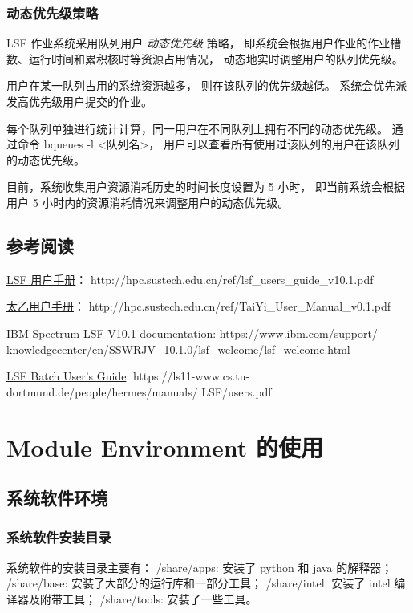 \documentclass[UTF8]{ctexart}
\newcommand{\myem}[1]{{\color{red}\em #1}}
\newcommand{\mynnote}[1]{\colorbox{gray!15}{\color{blue!65}#1}}
\begin{document}
\subsubsection{动态优先级策略}
LSF 作业系统采用队列用户 \myem{动态优先级} 策略，
即系统会根据用户作业的作业槽数、运行时间和累积核时等资源占用情况，
动态地实时调整用户的队列优先级。

用户在某一队列占用的系统资源越多，
则在该队列的优先级越低。
系统会优先派发高优先级用户提交的作业。

每个队列单独进行统计计算，同一用户在不同队列上拥有不同的动态优先级。
通过命令 \mynnote{bqueues -l <队列名>}，
用户可以查看所有使用过该队列的用户在该队列的动态优先级。

目前，系统收集用户资源消耗历史的时间长度设置为 5 小时，
即当前系统会根据用户 5 小时内的资源消耗情况来调整用户的动态优先级。

\subsection{参考阅读}
\href{http://hpc.sustech.edu.cn/ref/lsf_users_guide_v10.1.pdf}{LSF 用户手册}：
http://hpc.sustech.edu.cn/ref/lsf\_users\_guide\_v10.1.pdf

\href{http://hpc.sustech.edu.cn/ref/TaiYi_User_Manual_v0.1.pdf}{太乙用户手册}：
http://hpc.sustech.edu.cn/ref/TaiYi\_User\_Manual\_v0.1.pdf

\href{https://www.ibm.com/support/knowledgecenter/en/SSWRJV_10.1.0/lsf_welcome/lsf_welcome.html}{IBM Spectrum LSF V10.1 documentation}:
https://www.ibm.com/support/\newline
knowledgecenter/en/SSWRJV\_10.1.0/lsf\_welcome/lsf\_welcome.html

\href{https://ls11-www.cs.tu-dortmund.de/people/hermes/manuals/LSF/users.pdf}{LSF Batch User's Guide}:
https://ls11-www.cs.tu-dortmund.de/people/hermes/manuals/\newline
LSF/users.pdf

\section{Module Environment 的使用}
\subsection{系统软件环境}
\subsubsection{系统软件安装目录}
系统软件的安装目录主要有：\newline
/share/apps: 安装了 python 和 java 的解释器；\newline
/share/base: 安装了大部分的运行库和一部分工具；\newline
/share/intel: 安装了 intel 编译器及附带工具；\newline
/share/tools: 安装了一些工具。
\end{document}
